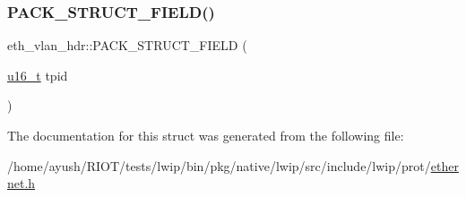 \mbox{\label{structeth__vlan__hdr_a580cefad860d7c3e84373236ff7f3aee}} 
\subsubsection{\texorpdfstring{P\+A\+C\+K\+\_\+\+S\+T\+R\+U\+C\+T\+\_\+\+F\+I\+E\+L\+D()}{PACK\_STRUCT\_FIELD()}\hspace{0.1cm}{\footnotesize\ttfamily [4/4]}}
{\footnotesize\ttfamily eth\+\_\+vlan\+\_\+hdr\+::\+P\+A\+C\+K\+\_\+\+S\+T\+R\+U\+C\+T\+\_\+\+F\+I\+E\+LD (\begin{DoxyParamCaption}\item[{\hyperlink{group__compiler__abstraction_ga77570ac4fcab86864fa1916e55676da2}{u16\+\_\+t}}]{tpid }\end{DoxyParamCaption})}



The documentation for this struct was generated from the following file\+:\begin{DoxyCompactItemize}
\item 
/home/ayush/\+R\+I\+O\+T/tests/lwip/bin/pkg/native/lwip/src/include/lwip/prot/\hyperlink{native_2lwip_2src_2include_2lwip_2prot_2ethernet_8h}{ethernet.\+h}\end{DoxyCompactItemize}
